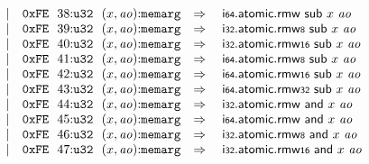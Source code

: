 $$\begin{array}[t]{@{}lrrl@{}l@{}l@{}l@{}}
& & | & \mathtt{0xFE}~~38{:}{\mathtt{u32}}~~(x, {\mathit{ao}}){:}{\mathtt{memarg}} & \quad\Rightarrow\quad{} & \mathsf{i{\scriptstyle 64}}{.}\mathsf{atomic}{.}\mathsf{rmw}~\mathsf{sub}~x~{\mathit{ao}} \\
& & | & \mathtt{0xFE}~~39{:}{\mathtt{u32}}~~(x, {\mathit{ao}}){:}{\mathtt{memarg}} & \quad\Rightarrow\quad{} & {\mathsf{i{\scriptstyle 32}}{.}\mathsf{atomic}{.}\mathsf{rmw}}{\mathsf{{\scriptstyle 8}}}~\mathsf{sub}~x~{\mathit{ao}} \\
& & | & \mathtt{0xFE}~~40{:}{\mathtt{u32}}~~(x, {\mathit{ao}}){:}{\mathtt{memarg}} & \quad\Rightarrow\quad{} & {\mathsf{i{\scriptstyle 32}}{.}\mathsf{atomic}{.}\mathsf{rmw}}{\mathsf{{\scriptstyle 16}}}~\mathsf{sub}~x~{\mathit{ao}} \\
& & | & \mathtt{0xFE}~~41{:}{\mathtt{u32}}~~(x, {\mathit{ao}}){:}{\mathtt{memarg}} & \quad\Rightarrow\quad{} & {\mathsf{i{\scriptstyle 64}}{.}\mathsf{atomic}{.}\mathsf{rmw}}{\mathsf{{\scriptstyle 8}}}~\mathsf{sub}~x~{\mathit{ao}} \\
& & | & \mathtt{0xFE}~~42{:}{\mathtt{u32}}~~(x, {\mathit{ao}}){:}{\mathtt{memarg}} & \quad\Rightarrow\quad{} & {\mathsf{i{\scriptstyle 64}}{.}\mathsf{atomic}{.}\mathsf{rmw}}{\mathsf{{\scriptstyle 16}}}~\mathsf{sub}~x~{\mathit{ao}} \\
& & | & \mathtt{0xFE}~~43{:}{\mathtt{u32}}~~(x, {\mathit{ao}}){:}{\mathtt{memarg}} & \quad\Rightarrow\quad{} & {\mathsf{i{\scriptstyle 64}}{.}\mathsf{atomic}{.}\mathsf{rmw}}{\mathsf{{\scriptstyle 32}}}~\mathsf{sub}~x~{\mathit{ao}} \\
& & | & \mathtt{0xFE}~~44{:}{\mathtt{u32}}~~(x, {\mathit{ao}}){:}{\mathtt{memarg}} & \quad\Rightarrow\quad{} & \mathsf{i{\scriptstyle 32}}{.}\mathsf{atomic}{.}\mathsf{rmw}~\mathsf{and}~x~{\mathit{ao}} \\
& & | & \mathtt{0xFE}~~45{:}{\mathtt{u32}}~~(x, {\mathit{ao}}){:}{\mathtt{memarg}} & \quad\Rightarrow\quad{} & \mathsf{i{\scriptstyle 64}}{.}\mathsf{atomic}{.}\mathsf{rmw}~\mathsf{and}~x~{\mathit{ao}} \\
& & | & \mathtt{0xFE}~~46{:}{\mathtt{u32}}~~(x, {\mathit{ao}}){:}{\mathtt{memarg}} & \quad\Rightarrow\quad{} & {\mathsf{i{\scriptstyle 32}}{.}\mathsf{atomic}{.}\mathsf{rmw}}{\mathsf{{\scriptstyle 8}}}~\mathsf{and}~x~{\mathit{ao}} \\
& & | & \mathtt{0xFE}~~47{:}{\mathtt{u32}}~~(x, {\mathit{ao}}){:}{\mathtt{memarg}} & \quad\Rightarrow\quad{} & {\mathsf{i{\scriptstyle 32}}{.}\mathsf{atomic}{.}\mathsf{rmw}}{\mathsf{{\scriptstyle 16}}}~\mathsf{and}~x~{\mathit{ao}} \\

\end{array}$$
